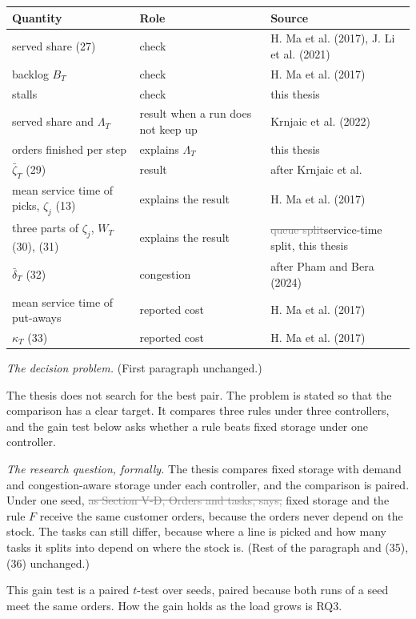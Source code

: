\documentclass[11pt,a4paper]{article}
\newcommand{\new}[1]{\textcolor{newc}{#1}}
\newcommand{\old}[1]{\textcolor{gray}{\sout{#1}}}
\begin{document}
\begin{center}\small
\begin{tabular}{lll}
\toprule
Quantity & Role & Source \\
\midrule
served share (27) & check & H. Ma et al. (2017), J. Li et al. (2021) \\
\new{backlog $B_T$} & \new{check} & \new{H. Ma et al. (2017)} \\
\new{stalls} & \new{check} & \new{this thesis} \\
served share and $\Lambda_T$ & result when a run does not keep up & Krnjaic et al. (2022) \\
\new{orders finished per step} & \new{explains $\Lambda_T$} & \new{this thesis} \\
$\bar\zeta_T$ (29) & result & after Krnjaic et al. \\
mean service time of picks, $\zeta_j$ (13) & explains the result & H. Ma et al. (2017) \\
three parts of $\zeta_j$, $W_T$ (30), (31) & explains the result & \old{queue split}\new{service-time split}, this thesis \\
$\bar\delta_T$ (32) & congestion & after Pham and Bera (2024) \\
mean service time of put-aways & reported cost & H. Ma et al. (2017) \\
$\kappa_T$ (33) & reported cost & H. Ma et al. (2017) \\
\bottomrule
\end{tabular}
\end{center}

\textit{The decision problem.} (First paragraph unchanged.)

The thesis does not search for the best pair. \new{The problem is stated so
that the comparison has a clear target.} It compares three rules under three
controllers, and the gain test below asks whether a rule beats fixed storage
under one controller.

\textit{The research question, formally.} The thesis compares fixed storage
with demand and congestion-aware storage under each controller, and the
comparison is paired. Under one seed, \old{as Section V-D, Orders and tasks,
says,} fixed storage and the rule $F$ receive the same customer orders\new{,
because the orders never depend on the stock}. The tasks can still differ,
because where a line is picked and how many tasks it splits into depend on
where the stock is. (Rest of the paragraph and (35), (36) unchanged.)

This gain test is a paired $t$-test over seeds\new{, paired because both runs
of a seed meet the same orders}. How the gain holds as the load grows is RQ3.
\end{document}

